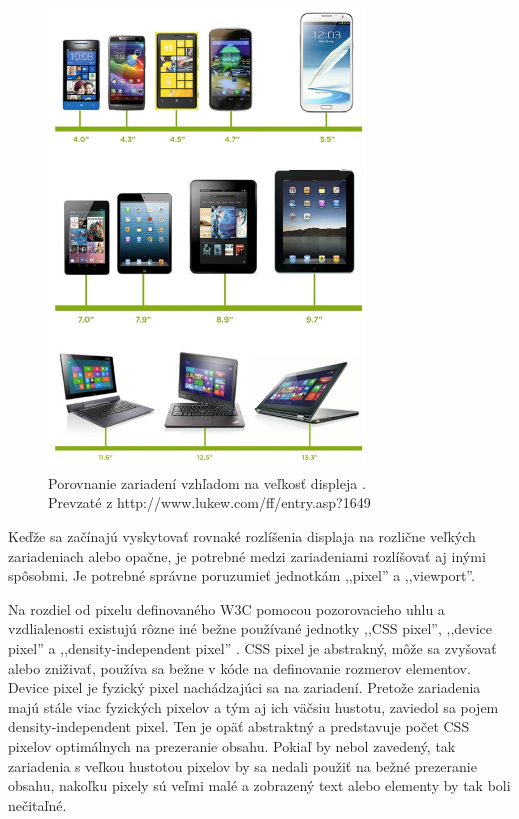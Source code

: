 \begin{figure}[H]
	\centering
	\includegraphics[width=0.75\textwidth]{img/tnav-devices.jpg}
	\caption[Porovnanie zariadení vzhľadom na veľkosť displeja]{
		Porovnanie zariadení vzhľadom na veľkosť displeja \cite{navigation}.\\
		Prevzaté z http://www.lukew.com/ff/entry.asp?1649}
	\label{fig: tnavmobile}
\end{figure}

Keďže sa začínajú vyskytovať rovnaké rozlíšenia displaja na rozlične veľkých zariadeniach alebo opačne, je potrebné medzi zariadeniami rozlíšovať aj inými spôsobmi. Je potrebné správne poruzumieť jednotkám ,,pixel'' a ,,viewport''.

Na rozdiel od pixelu definovaného W3C pomocou pozorovacieho uhlu a vzdlialenosti \cite{w3cpixel} existujú rôzne iné bežne používané jednotky ,,CSS pixel'', ,,device pixel'' a ,,density-independent pixel'' \cite{pixelnotpixel}. CSS pixel je abstrakný, môže sa zvyšovať alebo zniživať, používa sa bežne v kóde na definovanie rozmerov elementov.  Device pixel je fyzický pixel nachádzajúci sa na zariadení. Pretože zariadenia majú stále viac fyzických pixelov a tým aj ich väčsiu hustotu, zaviedol sa pojem density-independent pixel. Ten je opäť abstraktný a predstavuje počet CSS pixelov optimálnych na prezeranie obsahu. Pokiaľ by nebol zavedený, tak zariadenia s veľkou hustotou pixelov by sa nedali použiť na bežné prezeranie obsahu, nakoľku pixely sú veľmi malé a zobrazený text alebo elementy by tak boli nečitaľné.

